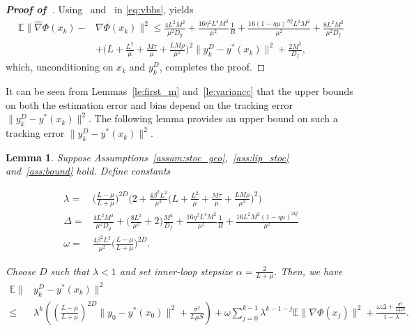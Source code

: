 \documentclass{osudissert96}
\newtheorem{lemma}{Lemma}
\begin{document}
\begin{proof}[\bf Proof of~]
 Using~ and~ in \cref{eq:vbbs}, yields 
\begin{align}
\mathbb{E}\|\widehat \nabla \Phi(x_k)-&\nabla \Phi(x_k)\|^2 \leq   \frac{4L^2M^2}{\mu^2D_g} + \frac{16\eta^2  L^4M^2}{\mu^2} \frac{1}{B}+\frac{16(1-\eta \mu)^{2Q}L^2M^2}{\mu^2}+ \frac{8L^2M^2}{\mu^2D_f}\nonumber
\\&+ \Big( L+\frac{L^2}{\mu} + \frac{M\tau}{\mu}+\frac{LM\rho}{\mu^2}\Big)^2 \|y_k^D-y^*(x_k)\|^2 + \frac{2M^2}{D_f},
\end{align}
which, unconditioning on $x_k$ and $y_k^D$, completes the proof. 
\end{proof}
It can be seen from Lemmas~\ref{le:first_m} and~\ref{le:variancc} that the upper bounds on both the estimation error and bias depend on the tracking error $\|y_k^D-y^*(x_k)\|^2$. The following lemma provides an upper bound on such a tracking error $\|y_k^D-y^*(x_k)\|^2$. 
\begin{lemma}\label{tra_error}
Suppose Assumptions~\ref{assum:stoc_geo},~\ref{ass:lip_stoc} and~\ref{ass:bound} hold. Define constants
\begin{small}
\begin{align}\label{eq:defs}
\lambda=&  \Big(\frac{L-\mu}{L+\mu}\Big)^{2D} \Big(2+  \frac{4\beta^2L^2}{\mu^2}  \Big( L+\frac{L^2}{\mu} + \frac{M\tau}{\mu}+\frac{LM\rho}{\mu^2}\Big)^2  \Big) \nonumber
\\\Delta =&\frac{4L^2M^2}{\mu^2D_g} + \Big(\frac{8L^2}{\mu^2} + 2\Big) \frac{M^2}{D_f}+ \frac{16\eta^2  L^4M^2}{\mu^2} \frac{1}{B}+\frac{16 L^2M^2(1-\eta \mu)^{2Q}}{\mu^2} 
\nonumber
\\\omega = &\frac{4\beta^2L^2}{\mu^2} \Big(\frac{L-\mu}{L+\mu}\Big)^{2D}. 
\end{align}
\end{small}
\hspace{-0.12cm}Choose $D$ such that $\lambda<1$ and set inner-loop stepsize $\alpha=\frac{2}{L+\mu}$. Then, we have 
{\small\begin{align*}
\mathbb{E}\|&y_k^{D}-y^*(x_k) \|^2 \nonumber
\\\leq&\lambda^{k} \left( \left(\frac{L-\mu}{L+\mu}\right)^{2D}\|y_0-y^*(x_0)\|^2 + \frac{\sigma^2}{L\mu S}\right) + \omega\sum_{j=0}^{k-1}\lambda^{k-1-j} \mathbb{E}\|\nabla \Phi(x_j)\|^2 + \frac{\omega\Delta +\frac{\sigma^2}{L\mu S}}{1-\lambda}.
\end{align*}}
\end{lemma}
\end{document}
